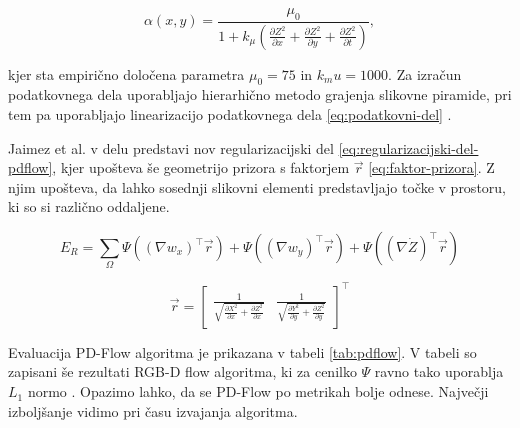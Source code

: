 \begin{equation}\label{eq:utez}
 \alpha(x,y) = \frac{\mu_0}{1 + k_\mu \left( \frac{\partial Z^2}{\partial x} + \frac{\partial Z^2}{\partial y} + \frac{\partial Z^2}{\partial t} \right)},
\end{equation}

kjer sta empirično določena parametra $\mu_0 = 75$ in $k_mu = 1000$. Za izračun podatkovnega dela uporabljajo hierarhično metodo grajenja slikovne piramide, pri tem pa uporabljajo linearizacijo podatkovnega dela \eqref{eq:podatkovni-del} \cite{jaimez2015primal}.

Jaimez et al. v delu \cite{jaimez2015primal} predstavi nov regularizacijski del \eqref{eq:regularizacijski-del-pdflow}, kjer upošteva še geometrijo prizora s faktorjem $\vec{r}$ \eqref{eq:faktor-prizora}. Z njim upošteva, da lahko sosednji slikovni elementi predstavljajo točke v prostoru, ki so si različno oddaljene.

\begin{equation}\label{eq:regularizacijski-del-pdflow}
E_R = \sum_\Omega \Psi\left( (\nabla w_x)^\top \vec{r} \right) + \Psi\left( (\nabla w_y)^\top \vec{r} \right) + \Psi\left( (\nabla \dot{Z})^\top \vec{r} \right)
\end{equation}

\begin{equation}\label{eq:faktor-prizora}
\vec{r} =
\begin{bmatrix}
\frac{1}{\sqrt{\frac{\partial X^2}{\partial x} + \frac{\partial Z^2}{\partial x}}} &
\frac{1}{\sqrt{\frac{\partial Y^2}{\partial y} + \frac{\partial Z^2}{\partial y}}}
\end{bmatrix}^\top
\end{equation}

Evaluacija PD-Flow algoritma je prikazana v tabeli \ref{tab:pdflow}. V tabeli so zapisani še rezultati RGB-D flow algoritma, ki za cenilko $\Psi$ ravno tako uporablja $L_1$ normo \cite{jaimez2015primal}. Opazimo lahko, da se PD-Flow po metrikah bolje odnese. Največji izboljšanje vidimo pri času izvajanja algoritma.

